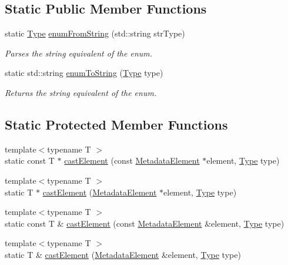 \subsection*{Static Public Member Functions}
\begin{DoxyCompactItemize}
\item 
static \hyperlink{classBUSBOY_1_1MetadataElement_ab66bf575c7d26f857a2871d42bd97d12}{Type} \hyperlink{classBUSBOY_1_1MetadataElement_a433c50e9707c1219f43c203d03b46cd5}{enumFromString} (std::string strType)
\begin{DoxyCompactList}\small\item\em Parses the string equivalent of the enum. \item\end{DoxyCompactList}\item 
static std::string \hyperlink{classBUSBOY_1_1MetadataElement_ab47c6ba17444aad6b1355bbba53280f5}{enumToString} (\hyperlink{classBUSBOY_1_1MetadataElement_ab66bf575c7d26f857a2871d42bd97d12}{Type} type)
\begin{DoxyCompactList}\small\item\em Returns the string equivalent of the enum. \item\end{DoxyCompactList}\end{DoxyCompactItemize}
\subsection*{Static Protected Member Functions}
\begin{DoxyCompactItemize}
\item 
{\footnotesize template$<$typename T $>$ }\\static const T $\ast$ \hyperlink{classBUSBOY_1_1MetadataElement_adb43074cccd4b5497e8270c52d22d557}{castElement} (const \hyperlink{classBUSBOY_1_1MetadataElement}{MetadataElement} $\ast$element, \hyperlink{classBUSBOY_1_1MetadataElement_ab66bf575c7d26f857a2871d42bd97d12}{Type} type)
\item 
{\footnotesize template$<$typename T $>$ }\\static T $\ast$ \hyperlink{classBUSBOY_1_1MetadataElement_ac99ac7b0cb21562de6f6b8384e9e1d50}{castElement} (\hyperlink{classBUSBOY_1_1MetadataElement}{MetadataElement} $\ast$element, \hyperlink{classBUSBOY_1_1MetadataElement_ab66bf575c7d26f857a2871d42bd97d12}{Type} type)
\item 
{\footnotesize template$<$typename T $>$ }\\static const T \& \hyperlink{classBUSBOY_1_1MetadataElement_ac5a43c0171daa27d6b6d21979a1dfcd5}{castElement} (const \hyperlink{classBUSBOY_1_1MetadataElement}{MetadataElement} \&element, \hyperlink{classBUSBOY_1_1MetadataElement_ab66bf575c7d26f857a2871d42bd97d12}{Type} type)
\item 
{\footnotesize template$<$typename T $>$ }\\static T \& \hyperlink{classBUSBOY_1_1MetadataElement_a690ed8d331b145bbb8cbc2f545da9f8a}{castElement} (\hyperlink{classBUSBOY_1_1MetadataElement}{MetadataElement} \&element, \hyperlink{classBUSBOY_1_1MetadataElement_ab66bf575c7d26f857a2871d42bd97d12}{Type} type)
\end{DoxyCompactItemize}


